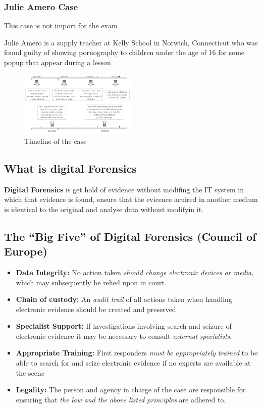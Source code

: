 \subsubsection{Julie Amero Case}

\begin{boxH}
  This case is not import for the exam
\end{boxH}

Julie Amero is a supply teacher at Kelly School in Norwich, Connecticut
who was found guilty of showing pornography to children under the age of 16
for some popup that appear during a lesson

\begin{figure}[h!]
  \centering
  \includegraphics[width=0.5\textwidth]{img/amero_case.png}
  \caption{Timeline of the case}
  \label{fig:amero case}
\end{figure}

\subsection{What is digital Forensics}

\textbf{Digital Forensics} is get hold of evidence without modifing the IT
system in which that evidence is found, ensure that the
evicence acuired in another medium is identical to the original and
analyse data without modifyin it.

\subsection{The “Big Five” of Digital Forensics (Council of Europe)}

\begin{itemize}
  \item \textbf{Data Integrity:} No action taken \textit{should change electronic devices or media},
    which may subsequently be relied upon in court.
  \item \textbf{Chain of custody:} An \textit{audit trail} of all actions taken when handling electronic
    evidence should be created and preserved
  \item \textbf{Specialist Support:} If investigations involving search and seizure of electronic
    evidence it may be necessary to consult \textit{external specialists}.
  \item \textbf{Appropriate Training:} First responders \textit{must be appropriately trained} to be able
    to search for and seize electronic evidence if no experts are available at the scene
  \item \textbf{Legality:} The person and agency in charge of the case are responsible
    for ensuring that \textit{the law and the above listed principles} are adhered to.
\end{itemize}

